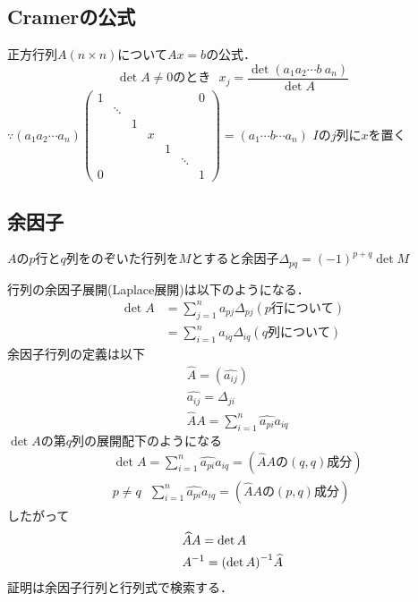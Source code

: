 \subsection{Cramerの公式}
正方行列$A(n\times n)$について$Ax=b$の公式．
\begin{equation}
  \det A\neq 0のとき\ \ \ x_j =\displaystyle\frac{\det (a_1 a_2 \cdots b\ a_n )}{\det A}
\end{equation}
$\because (a_1 a_2 \cdots a_n )\begin{pmatrix}
  1&\ &\ &\ &\ &\ &0\\
  \ &\ddots&\ &\ &\ &\ &\ \\
  \ &\ &1&\ &\ &\ &\ \\
  \ &\ &\ &x&\ &\ &\ \\
  \ &\ &\ &\ &1&\ &\ \\
  \ &\ &\ &\ &\ &\ddots&\ \\
  0&\ &\ &\ &\ &\ &1
\end{pmatrix}=(a_1 \cdots b\cdots a_n )$ $Iのj列にxを置く$
\subsection{余因子}
$Aのp行とq列をのぞいた行列をMとすると$余因子${\Delta}_{pq}={(-1)}^{p+q}\det M$

行列の余因子展開(Laplace展開)は以下のようになる．
\begin{align*}
  \det A&=\displaystyle\sum_{j=1}^n a_{pj}{\Delta}_{pj}(p行について)\\
  &=\displaystyle\sum_{i=1}^n a_{iq}{\Delta}_{iq}(q列について)
\end{align*}
余因子行列の定義は以下
\begin{align*}
  &\widehat{A}=(\widehat{a_{ij}})\\
  &\widehat{a_{ij}}={\Delta}_{ji}\\
  &\widehat{A}A=\displaystyle\sum_{i=1}^n \widehat{a_{pi}}a_{iq}
\end{align*}
$\det Aの第q列の展開配下のようになる$
\begin{align}
  &\det A=\displaystyle\sum_{i=1}^n \widehat{a_{pi}}a_{iq}=(\widehat{A}Aの(q,q)成分)\\
  &p\neq q\ \ \ \displaystyle\sum_{i=1}^n \widehat{a_{pi}}a_{iq}=(\widehat{A}Aの(p,q)成分)
\end{align}
したがって
\begin{align}
  &\widehat{A}A=\det A\\
  &{A}^{-1}={(\det A)}^{-1}\widehat{A}
\end{align}
証明は余因子行列と行列式で検索する．
